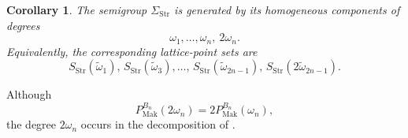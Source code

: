 \documentclass[a4paper, 12pt]{amsart}
\newtheorem{corollary}[theorem]{Corollary}
\newcommand{\Mak}{\mathrm{Mak}}
\newcommand{\Str}{\mathrm{Str}}
\begin{document}
\begin{corollary}\label{cor:generators}
The semigroup $\Sigma_{\Str}$ is generated by its homogeneous components of degrees
\[
                         \omega_1,\ldots,\omega_n,\ 2\omega_n.
\]
Equivalently, the corresponding lattice-point sets are
\[
 S_{\Str}(\widetilde\omega_1),\,
 S_{\Str}(\widetilde\omega_3),\ldots,\,
 S_{\Str}(\widetilde\omega_{2n-1}),\,
 S_{\Str}(2\widetilde\omega_{2n-1}).
\]
\end{corollary}

Although
\[
 P_{\Mak}^{B_n}(2\omega_n)=2P_{\Mak}^{B_n}(\omega_n),
\]
the degree $2\omega_n$ occurs in the decomposition of \cite[Lemma~5.1]{Mak19}.

\printbibliography
\end{document}

